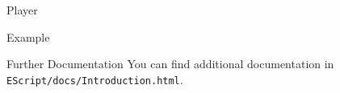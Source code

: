 \documentclass[ucs,9pt]{beamer}
\begin{document}
\begin{frame}{Player}
	\begin{block}{Example}
		
	\end{block}
\end{frame}
%
%
%
\begin{frame}{Further Documentation}
	You can find additional documentation in \texttt{EScript/docs/Introduction.html}.
\end{frame}
%
%
%
%
%
%
\end{document}
